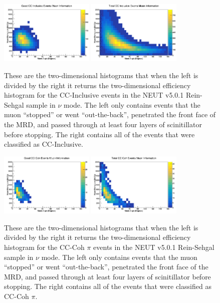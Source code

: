 \documentclass[11pt]{article}
\begin{document}
\begin{figure}[H]
\centering
\includegraphics[width=0.4\textwidth]{OldNMReinSehgalImages/6-GoodCCCohMuonInfoNMORS.png}
\includegraphics[width=0.4\textwidth]{OldNMReinSehgalImages/9-TotalCCCohMuonInfoNMORS.png}
\caption{These are the two-dimensional histograms that when the left is divided by the right it returns the two-dimensional efficiency histogram for the CC-Inclusive events in the NEUT v5.0.1 Rein-Sehgal sample in $\nu$ mode. The left only contains events that the muon ``stopped'' or went ``out-the-back'', penetrated the front face of the MRD, and passed through at least four layers of scinitillator before stopping. The right contains all of the events that were classified as CC-Inclusive.}
\label{fig:app:NMCCInclusiveMuon2DORS}
\end{figure}

\begin{figure}[H]
\centering
\includegraphics[width=0.4\textwidth]{OldNMReinSehgalImages/7.png}
\includegraphics[width=0.4\textwidth]{OldNMReinSehgalImages/8.png}
\caption{These are the two-dimensional histograms that when the left is divided by the right it returns the two-dimensional efficiency histogram for the CC-Coh $\pi$ events in the NEUT v5.0.1 Rein-Sehgal sample in $\nu$ mode. The left only contains events that the muon ``stopped'' or went ``out-the-back'', penetrated the front face of the MRD, and passed through at least four layers of scinitillator before stopping. The right contains all of the events that were classified as CC-Coh $\pi$.}
\label{fig:app:NMCCCohMuon2DORS}
\end{figure}
\end{document}
